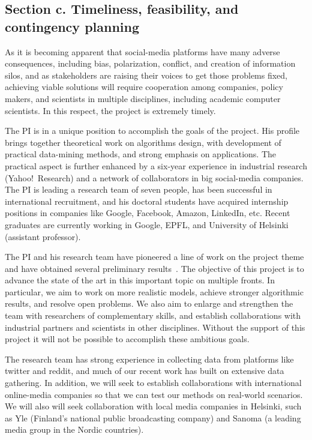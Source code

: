 \documentclass[a4paper,11pt]{article}
\begin{document}
\subsection*{Section c. Timeliness, feasibility, and contingency planning}

As it is becoming apparent that social-media platforms have many adverse consequences,
including bias, polarization, conflict, and creation of information silos, 
and as stakeholders are raising their voices to get those problems fixed, 
achieving viable solutions will require cooperation among companies, policy makers, 
and scientists in multiple disciplines, including academic computer scientists. 
In this respect, the project is extremely timely.

\smallskip 
The PI is in a unique position to accomplish the goals of the project. 
His profile brings together 
the\-o\-ret\-i\-cal work on algorithms design,
with development of practical data-mining methods, 
and strong emphasis on applications.
The practical aspect is further enhanced by a six-year experience in industrial research 
(Yahoo!\ Research)
and a network of collaborators in big social-media companies.
The PI is leading a research team of seven people, 
has been successful in international recruitment, 
and his doctoral students have acquired internship positions in companies
like Google, Facebook, Amazon, LinkedIn, etc.
Recent graduates are currently working in Google, EPFL, 
and University of Helsinki (assistant professor).

\smallskip 
The PI and his research team have pioneered a line of work on the project theme
and have obtained several preliminary results~\cite{diversity-cascade,garimella2017reducing,garimella2017balancing,garimella2018quantifying,lahoti2018joint,diversity-static}.
The objective of this project is to advance the state of the art in this important topic
on multiple fronts. 
In particular, we aim to work on more realistic models, 
achieve stronger algorithmic results, 
and resolve open problems. 
We also aim to enlarge and strengthen the team with researchers of complementary skills, 
and establish collaborations with industrial partners and scientists in other disciplines.
Without the support of this project it will not be possible to accomplish these ambitious goals.

\smallskip 
The research team has strong experience in collecting data from platforms like twitter and reddit, 
and much of our recent work has built on extensive data gathering.
In addition, we will seek to establish collaborations with international online-media companies
so that we can test our methods on real-world scenarios. 
We will also will seek collaboration with local media companies in Helsinki, 
such as
Yle (Finland's national public broadcasting company)
and Sanoma (a leading media group in the Nordic countries).
\end{document}
